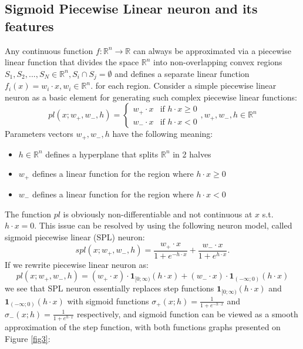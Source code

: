\documentclass[sn-apa]{sn-jnl}%
\begin{document}
\subsection{Sigmoid Piecewise Linear neuron and its features}\label{subsec51}
Any continuous function $f: \mathbb{R}^n \to \mathbb{R} $ can always be approximated via a piecewise linear function that divides the space $\mathbb{R}^n$ into non-overlapping convex regions $S_1,S_2,...,S_N \in \mathbb{R}^n, S_i \cap S_j = \emptyset $  and defines a separate linear function $f_i(x) = w_i \cdot x, w_i \in \mathbb{R}^n.$ for each region. Consider a simple piecewise linear neuron as a basic element for generating such complex piecewise linear functions:
\begin{equation}
  pl(x;w_+,w_-,h) =
    \begin{cases}
      w_+ \cdot x & \text{if $h \cdot x \ge 0$}\\
      w_- \cdot x & \text{if $h \cdot x < 0$}
    \end{cases}
    , w_+, w_-, h \in \mathbb{R}^n \label{eq7}
\end{equation}
Parameters vectors $w_+,w_-,h$ have the following meaning: 
\begin{itemize}
\item $h \in \mathbb{R}^n$ defines a hyperplane that splits $\mathbb{R}^n$ in 2 halves
\item $w_+$ defines a linear function for the region where $h \cdot x \ge 0$
\item $w_-$ defines a linear function for the region where $h \cdot x < 0 $
\end{itemize}
The function $pl$ is obviously non-differentiable and not continuous at $x$ s.t. $h \cdot x = 0$. This issue can be resolved by using the following neuron model, called sigmoid piecewise linear (SPL) neuron:
\begin{equation}
spl(x;w_+,w_-,h) = \frac{w_+ \cdot x}{1 + e^{-h \cdot x}} + \frac{w_- \cdot x}{1 + e^{h \cdot x}}. \label{eq8}
\end{equation}
If we rewrite piecewise linear neuron as:
\begin{equation}
pl(x;w_+,w_-,h) = (w_+ \cdot x) \cdot \boldsymbol{1}_{[0;\infty)}(h \cdot x) + 
   (w_- \cdot x) \cdot \boldsymbol{1}_{(-\infty;0)}(h \cdot x) \label{eq9}
\end{equation}
we see that SPL neuron essentially replaces step functions $\boldsymbol{1}_{[0;\infty)}(h \cdot x)$ and $\boldsymbol{1}_{(-\infty;0)}(h \cdot x)$ with sigmoid functions $ \sigma_+(x;h) = \frac{1}{1 + e^{-h \cdot x}} $ and $ \sigma_-(x;h) = \frac{1}{1 + e^{h \cdot x}} $ respectively, and sigmoid function can be viewed as a smooth approximation of the step function, with both functions graphs presented on Figure \ref{fig3}:
\end{document}
